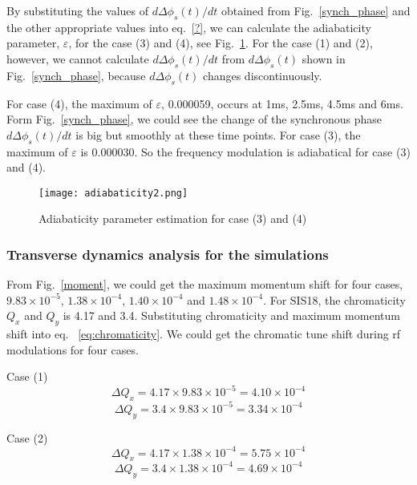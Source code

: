 \begin{itemize}
By substituting the values of $d\Delta \phi_s(t)/dt$ obtained from Fig.~\ref{synch_phase} and the other appropriate values into eq.~\ref{?}, we can calculate the adiabaticity parameter, $\varepsilon$, for the case (3) and (4), see Fig.~\ref{adiabaticity2}. For the case (1) and (2), however, we cannot calculate $d\Delta \phi_s(t)/dt$ from $d\Delta \phi_s(t)$  shown in Fig.~\ref{synch_phase}, because $d\Delta \phi_s(t)$ changes discontinuously. 

For case (4), the maximum of $\varepsilon$, 0.000059, occurs at 1ms, 2.5ms, 4.5ms and 6ms. Form Fig.~\ref{synch_phase}, we could see the change of the synchronous phase $d\Delta \phi_s(t)/dt$  is big but smoothly at these time points. For case (3), the maximum of $\varepsilon$ is 0.000030. So the frequency modulation is adiabatical for case (3) and (4).


\begin{figure}[!htb]
   \centering   
   \texttt{[image: adiabaticity2.png]}
   \caption{Adiabaticity parameter estimation for case (3) and (4)}
   \label{adiabaticity2}
\end{figure}
\end{itemize}
\subsubsection{Transverse dynamics analysis for the simulations}
From Fig.~\ref{moment}, we could get the maximum momentum shift for four cases, $9.83 \times 10^{-5}$, $1.38 \times 10^{-4}$, $1.40 \times 10^{-4}$ and $1.48 \times 10^{-4}$. For SIS18, the chromaticity $Q_x$ and $Q_y$ is 4.17 and 3.4. Substituting chromaticity and maximum momentum shift into eq. ~\ref{eq:chromaticity}. We could get the chromatic tune shift during rf modulations for four cases. 

Case (1) 
\begin{equation}
\Delta Q_x = 4.17 \times 9.83 \times 10^{-5}=4.10 \times 10^{-4}
\end{equation}
\begin{equation}
\Delta Q_y = 3.4 \times 9.83 \times 10^{-5}=3.34 \times 10^{-4} 
\end{equation}

Case (2)
\begin{equation}
\Delta Q_x = 4.17 \times 1.38 \times 10^{-4}=5.75 \times 10^{-4}
\end{equation}
\begin{equation}
\Delta Q_y = 3.4 \times 1.38 \times 10^{-4}=4.69 \times 10^{-4} 
\end{equation}


